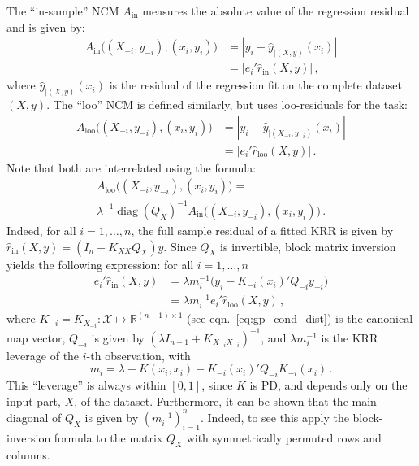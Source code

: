 \documentclass[a4paper,14pt]{extarticle}
\newcommand{\Xcal}{\mathcal{X}}
\newcommand{\Real}{\mathbb{R}}
\newcommand{\diag}{\mathop{\text{diag}}\nolimits}
\begin{document}
The ``in-sample'' NCM $A_{\text{in}}$ measures the absolute value of the regression
residual and is given by:
\begin{align}
  A_{\text{in}}\bigl((X_{-i}, y_{-i}), (x_i, y_i)\bigr)
    &= |y_i - \hat{y}_{|(X, y)}(x_i)| \nonumber\\
    &= |e_i' \hat{r}_{\text{in}}(X, y)| \label{eq:ins_ncm}
    \,,
\end{align}
where $\hat{y}_{|(X, y)}(x_i)$ is the residual of the regression fit on the complete
dataset $(X, y)$. The ``loo'' NCM is defined similarly, but uses loo-residuals for
the task:
\begin{align*}
  A_{\text{loo}}\bigl((X_{-i}, y_{-i}), (x_i, y_i)\bigr)
    &= |y_i - \hat{y}_{|(X_{-i}, y_{-i})}(x_i)| \\
    &= |e_i' \hat{r}_{\text{loo}}(X, y)|
    \,.
\end{align*}
Note that both are interrelated using the formula:
\begin{multline*}
  A_{\text{loo}}\bigl((X_{-i}, y_{-i}), (x_i, y_i)\bigr)
    = \\ \lambda^{-1} \diag(Q_X)^{-1}
    A_{\text{in}}\bigl((X_{-i}, y_{-i}), (x_i, y_i)\bigr)
    \,.
\end{multline*}
Indeed, for all $i=1,\ldots,n$, the full sample residual of a fitted KRR is given
by $\hat{r}_{\text{in}}(X, y) = (I_n - K_{XX} Q_X) y$. Since $Q_X$ is invertible,
block matrix inversion yields the following expression: for all $i=1,\ldots, n$
\begin{align}
  e_i' \hat{r}_{\text{in}}(X, y)
  &= \lambda m_i^{-1} \bigl(y_i - K_{-i}(x_i)' Q_{-i} y_{-i} \bigr) \nonumber \\
  &= \lambda m_i^{-1} e_i' \hat{r}_{\text{loo}}(X, y) \label{eq:loo_resid} \,,
\end{align}
where $K_{-i} = K_{X_{-i}}: \Xcal \mapsto \Real^{(n-1)\times1}$ (see eqn.~\ref{eq:gp_cond_dist})
is the canonical map vector, $Q_{-i}$ is given by $(\lambda I_{n-1} + K_{X_{-i}X_{-i}})^{-1}$,
and $\lambda m_i^{-1}$ is the KRR leverage of the $i$-th observation, with
\begin{equation*}
  m_i = \lambda + K(x_i, x_i) - K_{-i}(x_i)' Q_{-i} K_{-i}(x_i) \,.
\end{equation*}
This ``leverage'' is always within $[0,1]$, since $K$ is PD, and depends only on
the input part, $X$, of the dataset. Furthermore, it can be shown that the main
diagonal of $Q_X$ is given by $(m_i^{-1})_{i=1}^n$. Indeed, to see this apply the
block-inversion formula to the matrix $Q_X$ with symmetrically permuted rows and
columns.
\end{document}
